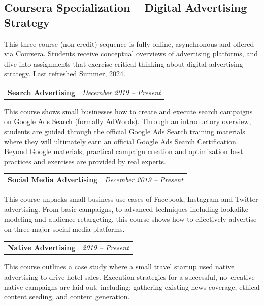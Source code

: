 \documentclass[11pt,letterpaper]{article}
\makeatletter
\newcommand{\cvcourse}[3]{%
  \begin{tabularx}{\textwidth}{@{}X >{\raggedleft\arraybackslash}p{0.33\textwidth}@{}}%
    \textbf{#1} & \textit{#2} \\
  \end{tabularx}\par
  {\small #3}\par
  \vspace{0.35em}
}
\makeatother
\begin{document}
\subsection*{Coursera Specialization -- Digital Advertising Strategy}
{\small This three-course (non-credit) sequence is fully online, asynchronous and offered via Coursera. Students receive conceptual overviews of advertising platforms, and dive into assignments that exercise critical thinking about digital advertising strategy. Last refreshed Summer, 2024.}\par
\vspace{0.5em}
\cvcourse{Search Advertising}{December 2019 -- Present}{This course shows small businesses how to create and execute search campaigns on Google Ads Search (formally AdWords). Through an introductory overview, students are guided through the official Google Ads Search training materials where they will ultimately earn an official Google Ads Search Certification. Beyond Google materials, practical campaign creation and optimization best practices and exercises are provided by real experts.}
\cvcourse{Social Media Advertising}{December 2019 -- Present}{This course unpacks small business use cases of Facebook, Instagram and Twitter advertising. From basic campaigns, to advanced techniques including lookalike modeling and audience retargeting, this course shows how to effectively advertise on three major social media platforms.}
\cvcourse{Native Advertising}{2019 -- Present}{This course outlines a case study where a small travel startup used native advertising to drive hotel sales. Execution strategies for a successful, no--creative native campaigns are laid out, including: gathering existing news coverage, ethical content seeding, and content generation.}
\end{document}
